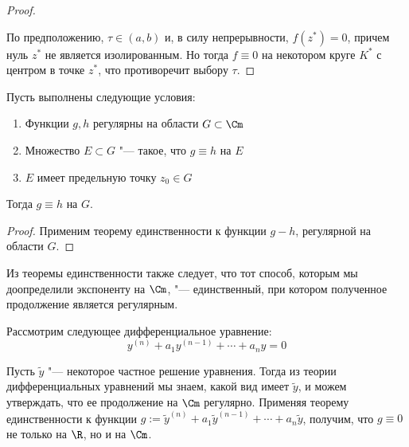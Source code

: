\begin{proof}
\begin{center}
{
		}
	\end{center}
	
	По предположению, $\tau \in (a, b)$ и, в силу непрерывности, $f(z^*) = 0$, причем нуль $z^*$ не является изолированным. Но тогда $f \equiv 0$ на некотором круге $K^*$ с центром в точке $z^*$, что противоречит выбору $\tau$.
\end{proof}

\begin{corollary}
	Пусть выполнены следующие условия:
	\begin{enumerate}
		\item Функции $g, h$ регулярны на области $G \subset \Cm$
		\item Множество $E \subset G$ "--- такое, что $g \equiv h$ на $E$
		\item $E$ имеет предельную точку $z_0 \in G$
	\end{enumerate}
	
	Тогда $g \equiv h$ на $G$.
\end{corollary}

\begin{proof}
	Применим теорему единственности к функции $g - h$, регулярной на области $G$.
\end{proof}

\begin{note}
	Из теоремы единственности также следует, что тот способ, которым мы доопределили экспоненту на $\Cm$, "--- единственный, при котором полученное продолжение является регулярным.
\end{note}

\begin{example}
	Рассмотрим следующее дифференциальное уравнение:
	\[y^{(n)} + a_1y^{(n-1)} + \dotsb + a_ny = 0\]
	
	Пусть $\widetilde y$ "--- некоторое частное решение уравнения. Тогда из теории дифференциальных уравнений мы знаем, какой вид имеет $\widetilde y$, и можем утверждать, что ее продолжение на $\Cm$ регулярно. Применяя теорему единственности к функции $g := \widetilde y^{(n)} + a_1\widetilde y^{(n-1)} + \dotsb + a_n\widetilde y$, получим, что $g \equiv 0$ не только на $\R$, но и на $\Cm$.
\end{example}